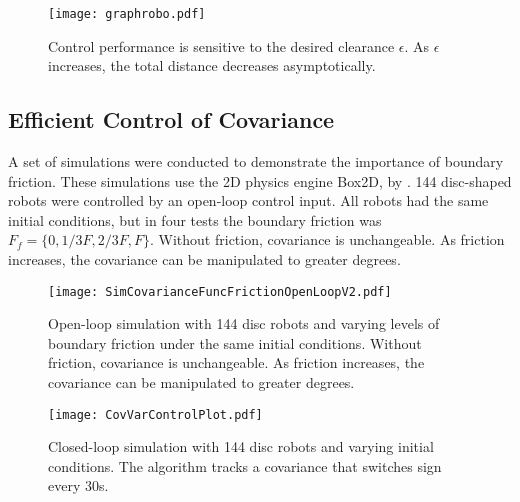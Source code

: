 \begin{figure}
\begin{center}
	\texttt{[image: graphrobo.pdf]}
\end{center}
\caption{\label{fig:graphrobo.pdf}
Control performance is sensitive to the desired clearance $\epsilon$.  As $\epsilon$ increases, the total distance decreases asymptotically.
}
\end{figure}

\subsection{Efficient Control of Covariance}
A set of simulations were conducted to demonstrate the importance of boundary friction.  These simulations use  the 2D physics engine Box2D, by \citet{catto2010box2d}.
 144 disc-shaped robots were controlled by an open-loop control input.  All robots had  the same initial conditions, but in four tests the boundary friction was $F_f = \{0,1/3 F, 2/3F, F\}$.
 Without friction, covariance is unchangeable.  As friction increases, the covariance can be manipulated to greater degrees.


\begin{figure}
\begin{center}
	\texttt{[image: SimCovarianceFuncFrictionOpenLoopV2.pdf]}
\end{center}
\caption{\label{fig:SimCovarianceFuncFrictionOpenLoop}
Open-loop simulation with 144 disc robots and varying levels of boundary friction under the same initial conditions.  Without friction, covariance is unchangeable.  As friction increases, the covariance can be manipulated to greater degrees.
}
\end{figure}


\begin{figure}
\begin{center}
	\texttt{[image: CovVarControlPlot.pdf]}
\end{center}
\caption{\label{fig:CovVarControlPlot}
Closed-loop simulation with 144 disc robots and varying  initial conditions.  The algorithm tracks a covariance that switches sign every 30s.}
\end{figure}

